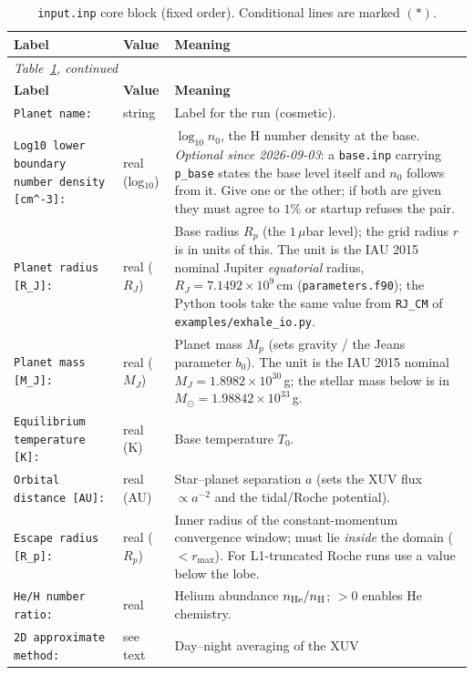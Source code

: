 \documentclass[english,a4paper]{my_memo}
\newcommand{\rp}{\ensuremath{R_p}}   %
\begin{document}
\begin{longtable}{@{}p{}p{}p{}@{}}
\caption{\texttt{input.inp} core block (fixed order). Conditional lines are
marked $(\ast)$.}\label{tab:inp-core}\\
\toprule
\textbf{Label} & \textbf{Value} & \textbf{Meaning} \\
\midrule
\endfirsthead
\multicolumn{3}{l}{\small\itshape Table~\ref{tab:inp-core}, continued}\\
\toprule \textbf{Label} & \textbf{Value} & \textbf{Meaning} \\ \midrule
\endhead
\bottomrule
\endfoot
\texttt{Planet name:} & string & Label for the run (cosmetic). \\
\texttt{Log10 lower boundary number density [cm\^{}-3]:} & real (log$_{10}$) &
  $\log_{10} n_0$, the H number density at the base. \emph{Optional since
  2026-09-03}: a \texttt{base.inp} carrying \texttt{p\_base} states the base
  level itself and $n_0$ follows from it. Give one or the other; if both are
  given they must agree to $1\%$ or startup refuses the pair. \\
\texttt{Planet radius [R\_J]:} & real ($R_J$) & Base radius $R_p$ (the $1\,\mu$bar
  level); the grid radius $r$ is in units of this. The unit is the IAU 2015
  nominal Jupiter \emph{equatorial} radius, $R_J=7.1492\times10^{9}$\,cm
  (\texttt{parameters.f90}); the Python tools take the same value from
  \texttt{RJ\_CM} of \texttt{examples/exhale\_io.py}. \\
\texttt{Planet mass [M\_J]:} & real ($M_J$) & Planet mass $M_p$ (sets gravity /
  the Jeans parameter $b_0$). The unit is the IAU 2015 nominal
  $M_J=1.8982\times10^{30}$\,g; the stellar mass below is in
  $M_\odot=1.98842\times10^{33}$\,g. \\
\texttt{Equilibrium temperature [K]:} & real (K) & Base temperature $T_0$. \\
\texttt{Orbital distance [AU]:} & real (AU) & Star--planet separation $a$ (sets
  the XUV flux $\propto a^{-2}$ and the tidal/Roche potential). \\
\texttt{Escape radius [R\_p]:} & real (\rp) & Inner radius of the
  constant-momentum convergence window; must lie \emph{inside} the domain
  ($<r_{\max}$). For L1-truncated Roche runs use a value below the lobe. \\
\texttt{He/H number ratio:} & real & Helium abundance $n_{\rm He}/n_{\rm H}$;
  $>0$ enables He chemistry. \\
\texttt{2D approximate method:} & see text & Day--night averaging of the XUV

\end{longtable}
\end{document}
